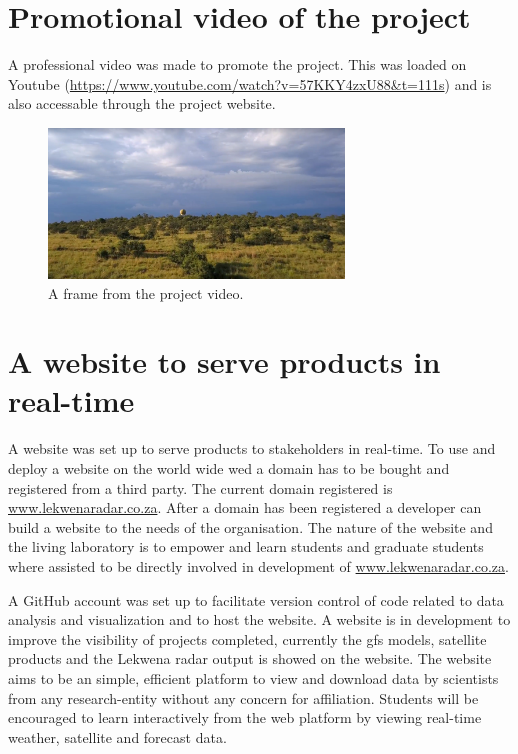 \documentclass{wrcreport}
\begin{document}
\section{Promotional video of the project}

A professional video was made to promote the project. This was loaded on Youtube (\url{https://www.youtube.com/watch?v=57KKY4zxU88&t=111s}) and is also accessable through the project website.

\begin{figure}[!htp]
  \begin{center}
\includegraphics[width=0.7\textwidth]{video} \caption[A frame from the project video.]{A frame from the project video.}
\label{fig:video}
  \end{center}
\end{figure}

\section{A website to serve products in real-time}

A website was set up to serve products to stakeholders in real-time.
To use and deploy a website on the world wide wed a domain has to be
bought and registered from a third party. The current domain
registered is \url{www.lekwenaradar.co.za}. After a domain has been
registered a developer can build a website to the needs of the
organisation. The nature of the website and the living laboratory is
to empower and learn students and graduate students where assisted to
be directly involved in development of \url{www.lekwenaradar.co.za}.

A GitHub account was set up to facilitate version control of code
related to data analysis and visualization and to host the website. A
website is in development to improve the visibility of projects
completed, currently the \gls{gfs} models, satellite products and the
Lekwena radar output is showed on the website. The website aims to be
an simple, efficient platform to view and download data by scientists
from any research-entity without any concern for affiliation. Students
will be encouraged to learn interactively from the web platform by
viewing real-time weather, satellite and forecast data.
\end{document}
